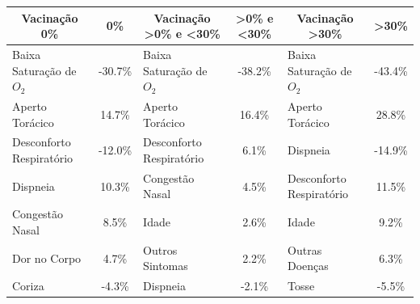 \begin{table}[H]
  \centering
  \tiny
  \begin{tabular}{|l|c|l|c|l|c|}
  \hline
  \multicolumn{1}{|c|}{\textbf{Vacinação 0\%}} & \textbf{0\%} & \multicolumn{1}{c|}{\textbf{Vacinação \textgreater{}0\% e \textless{}30\%}} & \textbf{\textgreater{}0\% e \textless{}30\%} & \multicolumn{1}{c|}{\textbf{Vacinação \textgreater{}30\%}} & \textbf{\textgreater{}30\%} \\ \hline
  Baixa Saturação de $O_2$                        & -30.7\%      & Baixa Saturação de $O_2$                                                       & -38.2\%                                      & Baixa Saturação de $O_2$                                      & -43.4\%                     \\ \hline
  Aperto Torácico                              & 14.7\%       & Aperto Torácico                                                             & 16.4\%                                       & Aperto Torácico                                            & 28.8\%                      \\ \hline
  Desconforto Respiratório                     & -12.0\%      & Desconforto Respiratório                                                    & 6.1\%                                        & Dispneia                                                   & -14.9\%                     \\ \hline
  Dispneia                                     & 10.3\%       & Congestão Nasal                                                             & 4.5\%                                        & Desconforto Respiratório                                   & 11.5\%                      \\ \hline
  Congestão Nasal                              & 8.5\%        & Idade                                                                       & 2.6\%                                        & Idade                                                      & 9.2\%                       \\ \hline
  Dor no Corpo                                 & 4.7\%        & Outros Sintomas                                                             & 2.2\%                                        & Outras Doenças                                             & 6.3\%                       \\ \hline
  Coriza                                       & -4.3\%       & Dispneia                                                                    & -2.1\%                                       & Tosse                                                      & -5.5\%                      \\ \hline

\end{tabular}
\end{table}
